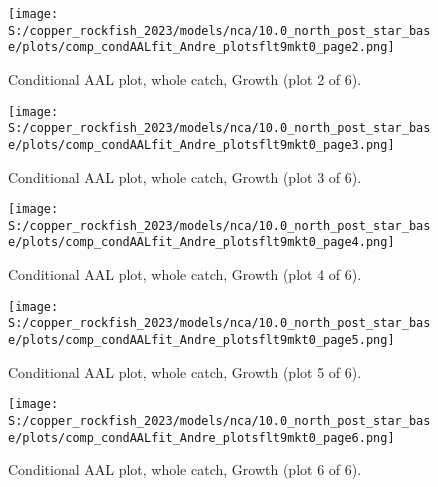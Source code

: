 \documentclass[11pt,
  letterpaper,
]{article}
\begin{document}
\begin{figure}
{\centering
\texttt{[image: S:/copper\_rockfish\_2023/models/nca/10.0\_north\_post\_star\_base/plots/comp\_condAALfit\_Andre\_plotsflt9mkt0\_page2.png]}
}
\caption{Conditional AAL plot, whole catch, Growth (plot 2 of 6).\label{fig:comp-condAALfit-Andre-plotsflt9mkt0-page2}}
\end{figure}

\begin{figure}
{\centering
\texttt{[image: S:/copper\_rockfish\_2023/models/nca/10.0\_north\_post\_star\_base/plots/comp\_condAALfit\_Andre\_plotsflt9mkt0\_page3.png]}
}
\caption{Conditional AAL plot, whole catch, Growth (plot 3 of 6).\label{fig:comp-condAALfit-Andre-plotsflt9mkt0-page3}}
\end{figure}

\begin{figure}
{\centering
\texttt{[image: S:/copper\_rockfish\_2023/models/nca/10.0\_north\_post\_star\_base/plots/comp\_condAALfit\_Andre\_plotsflt9mkt0\_page4.png]}
}
\caption{Conditional AAL plot, whole catch, Growth (plot 4 of 6).\label{fig:comp-condAALfit-Andre-plotsflt9mkt0-page4}}
\end{figure}

\begin{figure}
{\centering
\texttt{[image: S:/copper\_rockfish\_2023/models/nca/10.0\_north\_post\_star\_base/plots/comp\_condAALfit\_Andre\_plotsflt9mkt0\_page5.png]}
}
\caption{Conditional AAL plot, whole catch, Growth (plot 5 of 6).\label{fig:comp-condAALfit-Andre-plotsflt9mkt0-page5}}
\end{figure}

\begin{figure}
{\centering
\texttt{[image: S:/copper\_rockfish\_2023/models/nca/10.0\_north\_post\_star\_base/plots/comp\_condAALfit\_Andre\_plotsflt9mkt0\_page6.png]}
}
\caption{Conditional AAL plot, whole catch, Growth (plot 6 of 6).\label{fig:comp-condAALfit-Andre-plotsflt9mkt0-page6}}
\end{figure}
\end{document}
